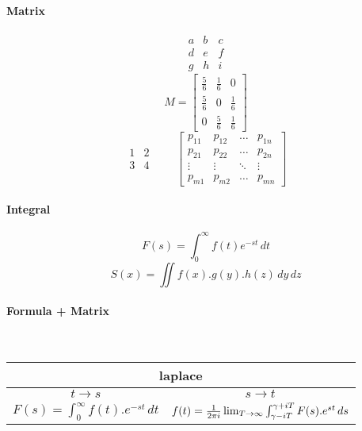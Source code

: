 \documentclass[a4paper,11pt]{article}
\begin{document}
\paragraph{Matrix}
\[
\begin{matrix}
a & b & c \\
d & e & f \\
g & h & i
\end{matrix}
\]
\begin{equation*}
M = \begin{bmatrix}
	\frac{5}{6} & \frac{1}{6} & 0           \\[0.3em]
	\frac{5}{6} & 0           & \frac{1}{6} \\[0.3em]
	0           & \frac{5}{6} & \frac{1}{6}
\end{bmatrix}
\end{equation*}
\begin{equation*}
	\begin{matrix}
		1 & 2 \\
		3 & 4
	\end{matrix} \qquad
	\begin{bmatrix}
		p_{11} & p_{12} &
		\ldots
		& p_{1n} \\
		p_{21} & p_{22} &
		\ldots
		& p_{2n} \\
		\vdots & \vdots &
		\ddots
		& \vdots \\
		p_{m1} & p_{m2} &
		\ldots
		& p_{mn}
	\end{bmatrix}
\end{equation*}

\paragraph{Integral}
\[ F(s) = \int_{0}^{\infty}{f(t)e^{-st}}\,dt \]
\[ S(x) = \iint f(x).g(y).h(z)\,dy\,dz\]
\paragraph{Formula + Matrix}
~
\begin{table}[h!]
	\centering
	\begin{tabular}{| m{6.1cm} | m{6.1cm} |}
	\hline
	\multicolumn{2}{|c|}{laplace}
	\\
	\hline
	\multicolumn{1}{|c|}{$t \rightarrow s$} & \multicolumn{1}{c|}{$s \rightarrow t$} \\
	\hline
	$F(s) = \int_{0}^{\infty}{f(t).e^{-st}}\,dt$ &
	$f(t) = \newline \frac{1}{2 \pi i}\lim_{T \to \infty} \int_{\gamma - iT}^{\gamma + iT} F(s).e^{st}\, ds$ \\
	\hline  
	\end{tabular}
\end{table}
\end{document}
